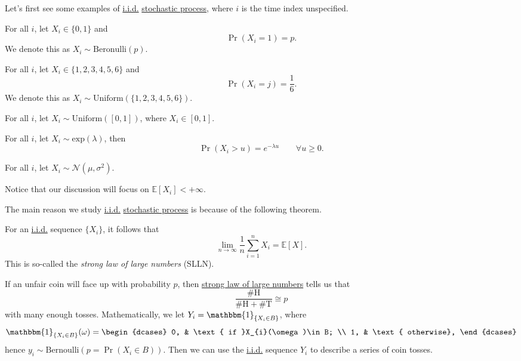 Let's first see some examples of \hyperref[def:i.i.d.]{i.i.d.} \hyperref[def:stochastic-process]{stochastic process}, where \(i\) is the time index unspecified.
\begin{eg}
	For all \(i\), let \(X_{i}\in\{0, 1\}\) and
	\[
		\Pr(X_{i} = 1) = p.
	\]
	We denote this as \(X_i\sim \mathrm{Beronulli}(p)\).
\end{eg}

\begin{eg}
	For all \(i\), let \(X_{i}\in\{1, 2, 3, 4, 5, 6\}\) and
	\[
		\Pr(X_{i} = j) = \frac{1}{6}.
	\]
	We denote this as \(X_i\sim \mathrm{Uniform}(\{1, 2, 3, 4, 5, 6\})\).
\end{eg}

\begin{eg}
	For all \(i\), let \(X_i\sim \mathrm{Uniform}(\left[ 0, 1 \right] )\), where \(X_{i}\in\left[ 0, 1 \right] \).
\end{eg}

\begin{eg}
	For all \(i\), let \(X_i\sim \mathrm{exp}(\lambda)\), then
	\[
		\Pr(X_{i}>u) = e^{-\lambda u}\qquad \forall u\geq 0.
	\]
\end{eg}

\begin{eg}
	For all \(i\), let \(X_i\sim \mathcal{N}(\mu, \sigma^2)\).
\end{eg}

\begin{remark}
	Notice that our discussion will focus on \(\mathbb{E}\left[X_i \right] < +\infty \).
\end{remark}

The main reason we study \hyperref[def:i.i.d.]{i.i.d.} \hyperref[def:stochastic-process]{stochastic process} is because of the following theorem.
\begin{theorem}\label{thm:SLLN}
	For an \hyperref[def:i.i.d.]{i.i.d.} sequence \(\{X_i\}\), it follows that
	\[
		\lim_{n \to \infty} \frac{1}{n}\sum\limits_{i=1}^{n} X_{i} = \mathbb{E}\left[X \right].
	\]
	This is so-called the \emph{strong law of large numbers} (SLLN).
\end{theorem}

\begin{eg}
	If an unfair coin will face up with probability \(p\), then \hyperref[thm:SLLN]{strong law of large numbers} tells us that
	\[
		\frac{\# \mathrm{H} }{\# \mathrm{H} + \# \mathrm{T} } \cong p
	\]
	with many enough tosses. Mathematically, we let \(Y_{i} = \mathbbm{1}_{\{X_{i}\in B\}}\), where
	\[
		\mathbbm{1}_{\{X_{i}\in B\}}(\omega) = \begin{dcases}
			0, & \text{ if }X_{i}(\omega)\in B; \\
			1, & \text{ otherwise},
		\end{dcases}
	\]
	hence \(y_{i}\sim \mathrm{Bernoulli}(p = \Pr(X_{i}\in B))\). Then we can use the \hyperref[def:i.i.d.]{i.i.d.} sequence \(Y_i\) to describe a series of coin tosses.
\end{eg}

